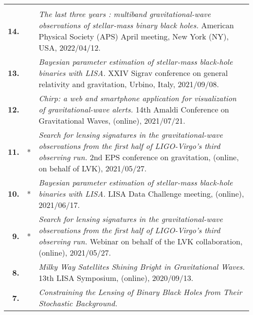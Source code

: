 {\begin{longtable}{rp{0.3cm}p{15.8cm}}
\vspace{0.05cm}\\
%
\textbf{14.} &  & \textit{The last three years : multiband gravitational-wave observations of stellar-mass binary black holes.}
\newline{}
American Physical Society (APS) April meeting, New York (NY), USA, 2022/04/12.
\vspace{0.05cm}\\
%
\textbf{13.} &  & \textit{Bayesian parameter estimation of stellar-mass black-hole binaries with LISA.}
\newline{}
XXIV Sigrav conference on general relativity and gravitation, Urbino, Italy, 2021/09/08.
\vspace{0.05cm}\\
%
\textbf{12.} &  & \textit{Chirp: a web and smartphone application for visualization of gravitational-wave alerts.}
\newline{}
14th Amaldi Conference on Gravitational Waves, (online), 2021/07/21.
\vspace{0.05cm}\\
%
\textbf{11.} & * & \textit{Search for lensing signatures in the gravitational-wave observations from the first half of LIGO-Virgo’s third observing run.}
\newline{}
2nd EPS conference on gravitation, (online, on behalf of LVK), 2021/05/27.
\vspace{0.05cm}\\
%
\textbf{10.} & * & \textit{Bayesian parameter estimation of stellar-mass black-hole binaries with LISA.}
\newline{}
LISA Data Challenge meeting, (online), 2021/06/17.
\vspace{0.05cm}\\
%
\textbf{9.} & * & \textit{Search for lensing signatures in the gravitational-wave observations from the first half of LIGO-Virgo’s third observing run.}
\newline{}
Webinar on behalf of the LVK collaboration, (online), 2021/05/27.
\vspace{0.05cm}\\
%
\textbf{8.} &  & \textit{Milky Way Satellites Shining Bright in Gravitational Waves.}
\newline{}
13th LISA Symposium, (online), 2020/09/13.
\vspace{0.05cm}\\
%
\textbf{7.} &  & \textit{Constraining the Lensing of Binary Black Holes from Their Stochastic Background.}
\newline{}

\end{longtable}}
